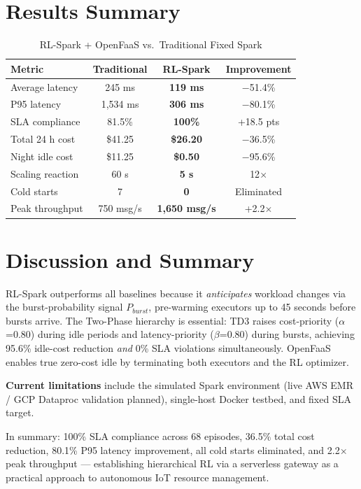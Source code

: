 \section{Results Summary}
\label{sec:summary_table}

\begin{table}[H]
\centering
\caption{RL-Spark + OpenFaaS vs.\ Traditional Fixed Spark}
\label{tab:improvement_full}
\begin{tabular}{lccc}
\toprule
\textbf{Metric}     & \textbf{Traditional} & \textbf{RL-Spark} & \textbf{Improvement} \\
\midrule
Average latency      & 245 ms    & \textbf{119 ms}      & $-$51.4\% \\
P95 latency          & 1,534 ms  & \textbf{306 ms}      & $-$80.1\% \\
SLA compliance       & 81.5\%    & \textbf{100\%}       & +18.5 pts \\
Total 24 h cost      & \$41.25   & \textbf{\$26.20}     & $-$36.5\% \\
Night idle cost      & \$11.25   & \textbf{\$0.50}      & $-$95.6\% \\
Scaling reaction     & 60 s      & \textbf{5 s}         & 12$\times$ \\
Cold starts          & 7         & \textbf{0}           & Eliminated \\
Peak throughput      & 750 msg/s & \textbf{1,650 msg/s} & +2.2$\times$ \\
\bottomrule
\end{tabular}
\end{table}

\section{Discussion and Summary}
\label{sec:discussion}
RL-Spark outperforms all baselines because it \textit{anticipates} workload changes
via the burst-probability signal $P_{burst}$, pre-warming executors up to 45 seconds
before bursts arrive. The Two-Phase hierarchy is essential: TD3 raises cost-priority
($\alpha$=0.80) during idle periods and latency-priority ($\beta$=0.80) during bursts,
achieving 95.6\% idle-cost reduction \textit{and} 0\% SLA violations simultaneously.
OpenFaaS enables true zero-cost idle by terminating both executors and the RL optimizer.

\textbf{Current limitations} include the simulated Spark environment (live AWS EMR /
GCP Dataproc validation planned), single-host Docker testbed, and fixed SLA target.

In summary: 100\% SLA compliance across 68 episodes, 36.5\% total cost reduction,
80.1\% P95 latency improvement, all cold starts eliminated, and 2.2$\times$ peak
throughput — establishing hierarchical RL via a serverless gateway as a practical
approach to autonomous IoT resource management.
